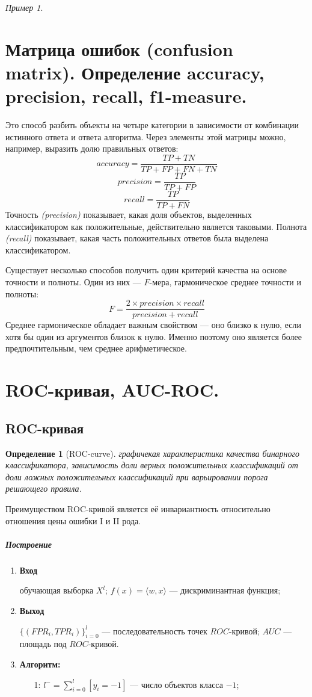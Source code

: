 \documentclass[a4paper, 12pt]{article}
\theoremstyle{plain} %
\newtheorem{definition}{Определение}
\theoremstyle{definition} %
\theoremstyle{remark} %
\newtheorem{example}{Пример}
\begin{document}
\begin{example}
\section{Матрица ошибок (confusion matrix). Определение accuracy, precision, recall, f1-measure.}
Это способ разбить объекты на четыре категории в зависимости от комбинации истинного ответа и ответа алгоритма. Через элементы этой матрицы можно, например, выразить долю правильных ответов:
\[
	accuracy = \frac{TP+TN}{TP+FP+FN+TN}
\]
\[
	precision = \frac{TP}{TP+FP}
\]
\[
	recall = \frac{TP}{TP+FN}
\]
Точность \emph{(precision)} показывает, какая доля объектов, выделенных классификатором как положительные, действительно является таковыми. Полнота \emph{(recall)} показывает, какая часть положительных ответов была выделена классификатором.

Существует несколько способов получить один критерий качества на основе точности и полноты. Один из них --- $F$-мера, гармоническое среднее точности и полноты:
\[
	F = \frac{2\times precision \times recall}{precision+recall}
\]
Среднее гармоническое обладает важным свойством --- оно близко к нулю, если хотя бы один из аргументов близок к нулю. Именно поэтому оно является более предпочтительным, чем среднее арифметическое.
\section{ROC-кривая, AUC-ROC.}

\subsection{ROC-кривая}

\begin{definition}[ROC-curve]
	графичекая характеристика качества бинарного классификатора, зависимость доли верных положительных классификаций от доли ложных положительных классификаций при варьировании порога решающего правила.
\end{definition}
	Преимуществом ROC-кривой является её инвариантность относительно отношения цены ошибки I и II рода.

\subparagraph{Построение}
	\begin{enumerate}
		\item \textbf{Вход}

			обучающая выборка $X^{l}$; $f(x) = \langle w,x \rangle$ --- дискриминантная функция;
		\item \textbf{Выход}

			$\{ (FPR_{i}, TPR_{i})\}_{i=0}^{l}$ --- последовательность точек $ROC$-кривой;
			$AUC$ --- площадь под $ROC$-кривой.
		\item \textbf{Алгоритм:}
		\begin{enumerate}
			\item[1:] $l^{-} = \sum^{l}_{i=0}[y_{i}=-1]$ --- число объектов класса $-1$;


\end{enumerate}
\end{enumerate}
\end{example}
\end{document}
